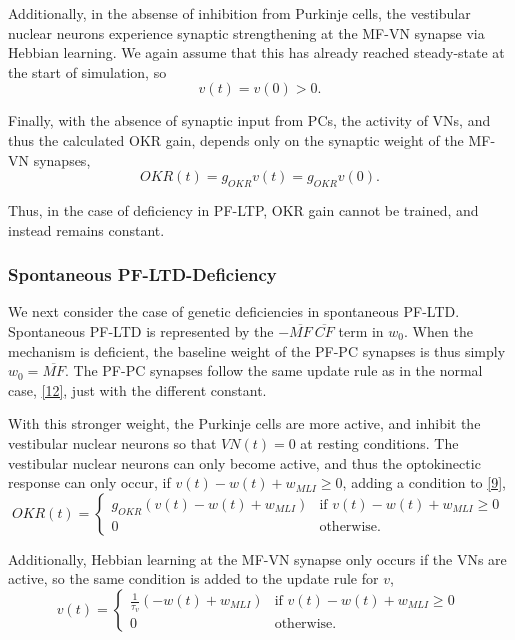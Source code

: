 \documentclass[10pt]{article}
\begin{document}
Additionally, in the absense of inhibition from Purkinje cells, the vestibular nuclear neurons experience synaptic strengthening at the MF-VN synapse via Hebbian learning. We again assume that this has already reached steady-state at the start of simulation, so \begin{equation}
    \label{17}
    v(t)=v(0)>0.
\end{equation}

Finally, with the absence of synaptic input from PCs, the activity of VNs, and thus the calculated OKR gain, depends only on the synaptic weight of the MF-VN synapses, \begin{equation}
    \label{18}
    OKR(t)=g_{OKR}v(t)=g_{OKR}v(0).
\end{equation}

Thus, in the case of deficiency in PF-LTP, OKR gain cannot be trained, and instead remains constant.

\subsubsection{Spontaneous PF-LTD-Deficiency}

We next consider the case of genetic deficiencies in spontaneous PF-LTD. Spontaneous PF-LTD is represented by the \(-\overline{MF}\ \overline{CF}\) term in \(w_0\). When the mechanism is deficient, the baseline weight of the PF-PC synapses is thus simply \(w_0 = \overline{MF}\). The PF-PC synapses follow the same update rule as in the normal case, \eqref{12}, just with the different constant.

With this stronger weight, the Purkinje cells are more active, and inhibit the vestibular nuclear neurons so that \(VN(t)=0\) at resting conditions. The vestibular nuclear neurons can only become active, and thus the optokinectic response can only occur, if \(v(t)-w(t)+w_{MLI} \ge 0\), adding a condition to \eqref{9}, \begin{equation}
    \label{19}
    OKR(t) = \begin{cases}
        g_{OKR}(v(t)-w(t)+w_{MLI}) & \text{if }v(t)-w(t)+w_{MLI} \ge 0\ \\
        0 & \text{otherwise.}
    \end{cases}
\end{equation}

Additionally, Hebbian learning at the MF-VN synapse only occurs if the VNs are active, so the same condition is added to the update rule for \(v\), \begin{equation}
    \label{20}
    v(t) = \begin{cases}
        \frac{1}{\tau_v}(-w(t)+w_{MLI})& \text{if }v(t)-w(t)+w_{MLI} \ge 0\ \\
        0 & \text{otherwise.}
    \end{cases}
\end{equation}
\end{document}
